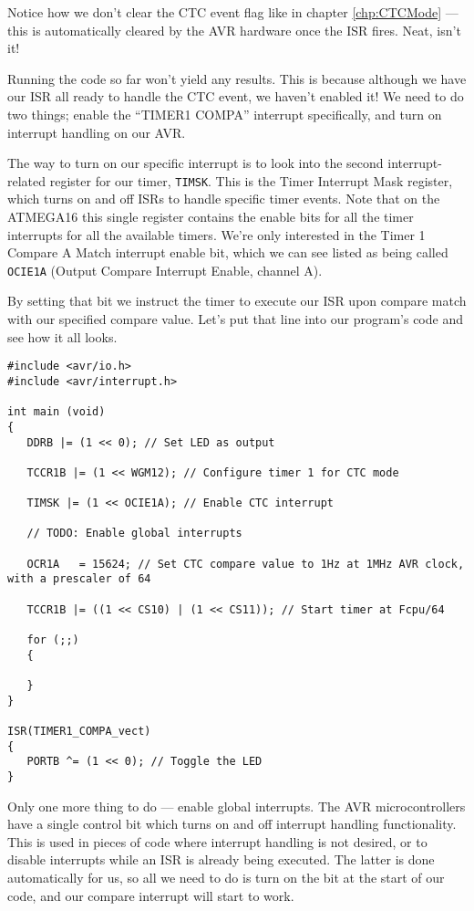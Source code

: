 \documentclass[a4paper,oneside]{book}
\begin{document}
Notice how we don't clear the CTC event flag like in chapter \ref{chp:CTCMode} --- this is automatically cleared by the AVR hardware once the ISR fires. Neat, isn't it!

Running the code so far won't yield any results. This is because although we have our ISR all ready to handle the CTC event, we haven't enabled it! We need to do two things; enable the ``TIMER1 COMPA'' interrupt specifically, and turn on interrupt handling on our AVR.

The way to turn on our specific interrupt is to look into the second interrupt-related register for our timer, \texttt{TIMSK}. This is the Timer Interrupt Mask register, which turns on and off ISRs to handle specific timer events. Note that on the ATMEGA16 this single register contains the enable bits for all the timer interrupts for all the available timers. We're only interested in the Timer 1 Compare A Match interrupt enable bit, which we can see listed as being called \texttt{OCIE1A} (Output Compare Interrupt Enable, channel A).

By setting that bit we instruct the timer to execute our ISR upon compare match with our specified compare value. Let's put that line into our program's code and see how it all looks. 

\begin{center}
\begin{lstlisting}
#include <avr/io.h>
#include <avr/interrupt.h>

int main (void)
{
   DDRB |= (1 << 0); // Set LED as output

   TCCR1B |= (1 << WGM12); // Configure timer 1 for CTC mode

   TIMSK |= (1 << OCIE1A); // Enable CTC interrupt

   // TODO: Enable global interrupts

   OCR1A   = 15624; // Set CTC compare value to 1Hz at 1MHz AVR clock, with a prescaler of 64

   TCCR1B |= ((1 << CS10) | (1 << CS11)); // Start timer at Fcpu/64

   for (;;)
   {

   }
}

ISR(TIMER1_COMPA_vect)
{
   PORTB ^= (1 << 0); // Toggle the LED
} 
\end{lstlisting}
\end{center}

Only one more thing to do --- enable global interrupts. The AVR microcontrollers have a single control bit which turns on and off interrupt handling functionality. This is used in pieces of code where interrupt handling is not desired, or to disable interrupts while an ISR is already being executed. The latter is done automatically for us, so all we need to do is turn on the bit at the start of our code, and our compare interrupt will start to work.
\end{document}
